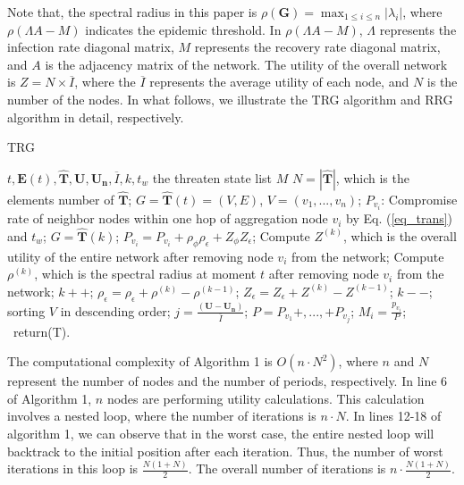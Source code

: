 \documentclass[lettersize,journal]{IEEEtran}
\begin{document}
  Note that, the spectral radius in this paper is $ \rho(\boldsymbol{G})=\max _{1 \leq i \leq n}\left|\lambda_{i}\right|$, where $\rho(\Lambda A-M)$ indicates the epidemic threshold. In $\rho(\Lambda A-M)$, $\Lambda$ represents the infection rate diagonal matrix, $M$ represents the recovery rate diagonal matrix, and $A$ is the adjacency matrix of the network. 
 The utility of the overall network is $Z=N\times \overline{I}$, where the $\overline{I}$ represents the average utility of each node, and $N$ is the number of the nodes. In what follows, we illustrate the TRG algorithm and RRG algorithm in detail, respectively.
\begin{algorithm}[h]
\small
\renewcommand{\algorithmicrequire}{\textbf{Input:}}
\renewcommand{\algorithmicensure}{\textbf{Output:}}
\caption{TRG}\label{alg:alg1} %
\begin{algorithmic}[1]
\REQUIRE $t,\bm{E}(t),\hat{\bm{T}},\bm{U},\bm{U_n},\overline{I},k,t_w$
\ENSURE  the threaten state list $M$
\STATE $N=|\hat{\bm{T}}|$, which is the elements number of $\hat{\bm{T}}$;
\STATE $G=\hat{\bm{T}}(t)=(V,E)$, $V=(v_1,...,v_n)$;
  \STATE $P_{v_i}$: Compromise rate of neighbor nodes within one hop of aggregation node $v_i$ by Eq. (\ref{eq_trans}) and $t_w$;
  \ENDFOR
        \STATE $G=\hat{\bm{T}}(k)$;
        \STATE $P_{v_i}=P_{v_i}+\rho_{\phi}\rho_{\epsilon}+Z_{\phi}Z_{\epsilon}$;
        \STATE Compute $Z^{(k)}$, which is the overall utility of the entire network after removing node $v_i$ from the network;
        \STATE Compute $\rho^{(k)}$, which is the spectral radius at moment $t$ after removing node $v_i$ from the network;
        \STATE $k++$;
        \ELSE 
         \STATE $\rho_{\epsilon}=\rho_{\epsilon}+\rho^{(k)}-\rho^{(k-1)}$;
         \STATE $Z_{\epsilon}=Z_{\epsilon}+Z^{(k)}-Z^{(k-1)}$;
         \STATE $k--$;
         \ENDIF
    \ENDWHILE
 \ENDFOR
 \STATE sorting $V$ in descending order;
 \STATE $j=\frac{(\bm{U}-\bm{U_n})}{\overline{I}}$;
 \STATE $P=P_{v_1}+,...,+P_{v_j}$;
  \STATE $M_i=\frac{p_{v_i}}{P}$;
 \ENDFOR\
 \STATE return(T).
\end{algorithmic}
\end{algorithm}
\par
The computational complexity of Algorithm 1 is $O(n\cdot N^2)$, where $n$ and $N$ represent the number of nodes and the number of periods, respectively. In line 6 of Algorithm 1, $n$ nodes are performing utility calculations. This calculation involves a nested loop, where the number of iterations is $n\cdot N$. In lines 12-18 of algorithm 1, we can observe that in the worst case, the entire nested loop will backtrack to the initial position after each iteration. Thus, the number of worst iterations in this loop is $\frac{N(1+N)}{2}$. The overall number of iterations is $n\cdot \frac{N(1+N)}{2}$. 
\end{document}
